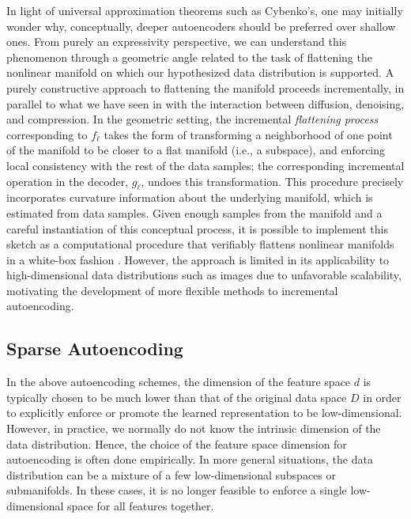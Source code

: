 \documentclass[../../book-main.tex]{subfiles}
\begin{document}
In light of universal approximation theorems such as Cybenko's, one
may initially wonder why, conceptually, deeper autoencoders should be preferred
over shallow ones.
From purely an expressivity perspective, we can understand this phenomenon
through a geometric angle related to the task of flattening the nonlinear
manifold on which our hypothesized data distribution is supported. A purely
constructive approach to flattening the manifold proceeds incrementally, in
parallel to what we have seen in
 with
the interaction between diffusion, denoising, and compression. In the geometric
setting, the incremental \textit{flattening process} corresponding to $f_{\ell}$
takes the form of transforming a neighborhood of one point of the manifold to be
closer to a flat manifold (i.e., a subspace), and enforcing local consistency
with the rest of the data samples; the corresponding incremental operation in
the decoder, $g_{\ell}$, undoes this transformation. This procedure precisely
incorporates curvature information about the underlying manifold, which is
estimated from data samples. Given enough samples from the manifold and
a careful instantiation of this conceptual process, it is possible to implement
this sketch as a computational procedure that verifiably flattens nonlinear
manifolds in a white-box fashion \cite{Psenka-JMLR24}. However, the approach is
limited in its applicability to high-dimensional data distributions such as
images due to unfavorable scalability, motivating the development of more
flexible methods to incremental autoencoding.

\subsection{Sparse Autoencoding}
In the above autoencoding schemes, the dimension of the feature space
$d$ is typically chosen to be much lower than that of the original data
space $D$ in order to explicitly enforce or promote the learned
representation to be low-dimensional. However, in practice, we
normally do not know the intrinsic dimension of the data
distribution. Hence, the choice of the feature space dimension for
autoencoding is often done empirically. In more general situations,
the data distribution can be a mixture of a few low-dimensional
subspaces or submanifolds. In these cases, it is no longer feasible
to enforce a single low-dimensional space for all features together.
\end{document}
